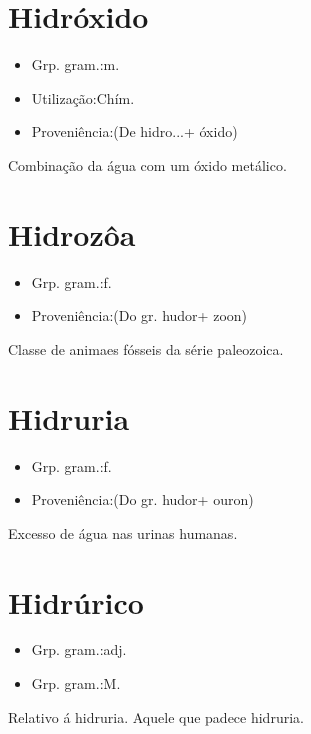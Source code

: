 \documentclass{article}
\begin{document}
\section{Hidróxido}
\begin{itemize}
\item {Grp. gram.:m.}
\end{itemize}
\begin{itemize}
\item {Utilização:Chím.}
\end{itemize}
\begin{itemize}
\item {Proveniência:(De \textunderscore hidro...\textunderscore  + \textunderscore óxido\textunderscore )}
\end{itemize}
Combinação da água com um óxido metálico.
\section{Hidrozôa}
\begin{itemize}
\item {Grp. gram.:f.}
\end{itemize}
\begin{itemize}
\item {Proveniência:(Do gr. \textunderscore hudor\textunderscore  + \textunderscore zoon\textunderscore )}
\end{itemize}
Classe de animaes fósseis da série paleozoica.
\section{Hidruria}
\begin{itemize}
\item {Grp. gram.:f.}
\end{itemize}
\begin{itemize}
\item {Proveniência:(Do gr. \textunderscore hudor\textunderscore  + \textunderscore ouron\textunderscore )}
\end{itemize}
Excesso de água nas urinas humanas.
\section{Hidrúrico}
\begin{itemize}
\item {Grp. gram.:adj.}
\end{itemize}
\begin{itemize}
\item {Grp. gram.:M.}
\end{itemize}
Relativo á hidruria.
Aquele que padece hidruria.
\end{document}
